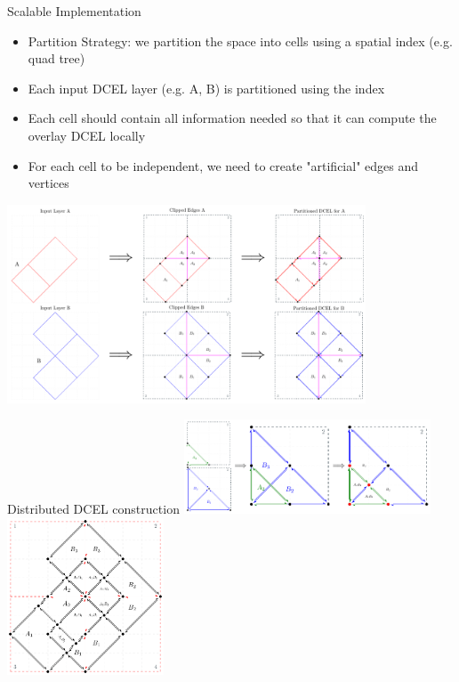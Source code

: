 \documentclass{beamer}
\begin{document}
    \begin{frame}{Scalable Implementation}
    \begin{itemize}
    \small
            \item Partition Strategy: we partition the space into cells using a spatial index (e.g. quad tree)
            \item Each input DCEL layer (e.g. A, B) is partitioned using the index
            \item Each cell should contain all information needed so that it can compute the overlay DCEL locally
            \item For each cell to be independent, we need to create "artificial" edges and vertices
            
    \end{itemize}    
        \centering
        \includegraphics[width=0.8\textwidth]{figures/partition_strategy}
    \end{frame}

    \begin{frame}{Distributed DCEL construction}
        \centering
        \includegraphics[width=0.55\textwidth]{figures/overlay_partition} \\
        \vspace{0.5cm}
        \includegraphics[width=0.35\textwidth]{figures/distributed_dcel}
    \end{frame}
\end{document}
